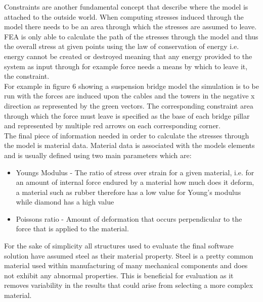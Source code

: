
\noindent
Constraints are another fundamental concept that describe where the model is attached to the outside world. When computing stresses induced through the model there needs to be an area through which the stresses are assumed to leave. FEA is only able to calculate the path of the stresses through the model and thus the overall stress at given points using the law of conservation of energy i.e. energy cannot be created or destroyed meaning that any energy provided to the system as input through for example force needs a means by which to leave it, the constraint. \\

\noindent
For example in figure 6 showing a suspension bridge model the simulation is to be run with the forces are induced upon the cables and the towers in the negative x direction as represented by the green vectors. The corresponding constraint area through which the force must leave is specified as the base of each bridge pillar and represented by multiple red arrows on each corresponding corner.\\

\noindent
The final piece of information needed in order to calculate the stresses through the model is material data. Material data is associated with the models elements and is usually defined using two main parameters which are:

\begin{itemize}
\item Youngs Modulus - The ratio of stress over strain for a given material, i.e. for an amount of internal force endured by a material how much does it deform, a material such as rubber therefore has a low value for Young's modulus while diamond has a high value\cite{YoungsModulus}
\item Poissons ratio - Amount of deformation that occurs perpendicular to the force that is applied to the material.
\end{itemize}

\noindent
For the sake of simplicity all structures used to evaluate the final software solution have assumed steel as their material property. Steel is a pretty common material used within manufacturing of many mechanical components and does not exhibit any abnormal properties. This is beneficial for evaluation as it removes variability in the results that could arise from selecting a more complex material.

